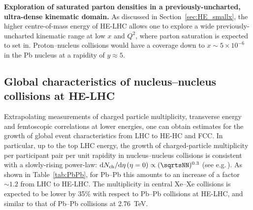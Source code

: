 \documentclass[../report.tex]{subfiles}
\begin{document}
\noindent
{\bf Exploration of saturated parton densities in a previously-uncharted, ultra-dense kinematic domain.}
As discussed in Section~\ref{sec:HE_smallx}, the higher centre-of-mass energy of HE-LHC allows one to explore a wide previously-uncharted kinematic range 
at low $x$ and $Q^2$, where parton saturation is expected to set in.  
Proton--nucleus collisions would have a coverage down  to $x\sim 5\times 10^{-6}$ in the Pb nucleus at a rapidity of $y\approx 5$. 


\subsection{Global characteristics of nucleus--nucleus collisions at HE-LHC}
\label{sec:HE_qgpglobal}

Extrapolating measurements of charged particle multiplicity, transverse energy and femtoscopic correlations 
at lower energies, one can obtain estimates
for the growth of global event characteristics from LHC to HE-HC and FCC. In particular, up to the top LHC energy, the growth of charged-particle 
multiplicity per participant pair per unit rapidity in nucleus--nucleus collisions is consistent with a slowly-rising power-law:
   ${\rm d}N_{\rm ch}/{\rm d}\eta\,(\eta=0) \propto (\sqrtsNN)^{0.3}$ (see e.g.\,\cite{Aamodt:2010pb}).
As shown in Table~\ref{tab:PbPb}, for Pb--Pb this amounts to an increase of a factor $\sim 1.2$ from LHC to HE-LHC. 
The multiplicity in central Xe--Xe collisions is expected to be lower by 35\% with respect to Pb--Pb collisions at HE-LHC, and similar to 
that of Pb--Pb collisions at 2.76~TeV.
\end{document}
